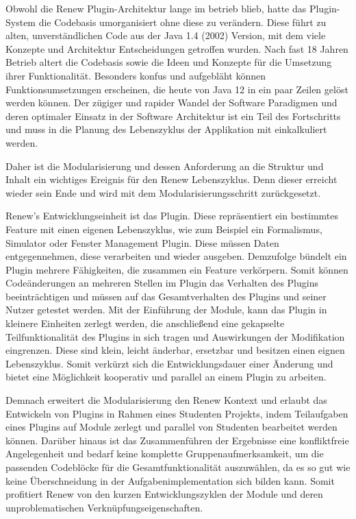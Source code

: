 Obwohl die Renew Plugin-Architektur lange im betrieb blieb, hatte das Plugin-System die Codebasis umorganisiert ohne diese zu verändern. Diese führt zu alten, unverständlichen Code aus der Java 1.4 (2002) Version, mit dem viele Konzepte und Architektur Entscheidungen getroffen wurden. Nach fast 18 Jahren Betrieb altert die Codebasis sowie die Ideen und Konzepte für die Umsetzung ihrer Funktionalität. Besonders konfus und aufgebläht können Funktionsumsetzungen erscheinen, die heute von Java 12 in ein paar Zeilen gelöst werden können. Der zügiger und rapider Wandel der Software Paradigmen und deren optimaler Einsatz in der Software Architektur ist ein Teil des Fortschritts und muss in die Planung des Lebenszyklus der Applikation mit einkalkuliert werden. \newline

Daher ist die Modularisierung und dessen Anforderung an die Struktur und Inhalt ein wichtiges Ereignis für den Renew Lebenszyklus. Denn dieser erreicht wieder sein Ende und wird mit dem Modularisierungsschritt zurückgesetzt. \bigbreak

Renew's Entwicklungseinheit ist das Plugin. Diese repräsentiert ein bestimmtes Feature mit einen eigenen Lebenszyklus, wie zum Beispiel ein Formalismus, Simulator oder Fenster Management Plugin. Diese müssen Daten entgegennehmen, diese verarbeiten und wieder ausgeben. Demzufolge bündelt ein Plugin mehrere Fähigkeiten, die zusammen ein Feature verkörpern. Somit können Codeänderungen an mehreren Stellen im Plugin das Verhalten des Plugins beeinträchtigen und müssen auf das Gesamtverhalten des Plugins und seiner Nutzer getestet werden. Mit der Einführung der Module, kann das Plugin in kleinere Einheiten zerlegt werden, die anschließend eine gekapselte Teilfunktionalität des Plugins in sich tragen und Auswirkungen der Modifikation eingrenzen. Diese sind klein, leicht änderbar, ersetzbar und besitzen einen eignen Lebenszyklus. Somit verkürzt sich die Entwicklungsdauer einer Änderung und bietet eine Möglichkeit kooperativ und parallel an einem Plugin zu arbeiten. \newline

Demnach erweitert die Modularisierung den Renew Kontext und erlaubt das Entwickeln von Plugins in Rahmen eines Studenten Projekts, indem Teilaufgaben eines Plugins auf Module zerlegt und parallel von Studenten bearbeitet werden können. Darüber hinaus ist das Zusammenführen der Ergebnisse eine konfliktfreie Angelegenheit und bedarf keine komplette Gruppenaufmerksamkeit, um die passenden Codeblöcke für die Gesamtfunktionalität auszuwählen, da es so gut wie keine Überschneidung in der Aufgabenimplementation sich bilden kann. Somit profitiert Renew von den kurzen Entwicklungszyklen der Module und deren unproblematischen Verknüpfungseigenschaften. 

